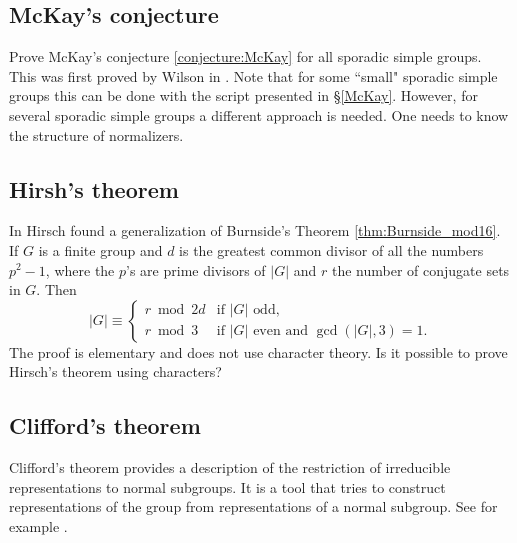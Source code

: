 \subsection*{McKay's conjecture}

Prove McKay's conjecture \ref{conjecture:McKay} for all sporadic simple groups. 
This was first proved by Wilson in \cite{MR1643110}. 
Note that
for some ``small" sporadic simple groups this can be done
with the script presented in \S\ref{McKay}. However, 
for several sporadic simple groups a different approach is needed. One needs
to know the structure of normalizers. 




\subsection*{Hirsh's theorem}

In \cite{MR36755} Hirsch found a generalization of Burnside's Theorem \ref{thm:Burnside_mod16}.  
If $G$ is a finite group and $d$ is the greatest common divisor of all 
the numbers $p^2-1$, where the $p$'s are prime divisors of $|G|$ and $r$ the number of conjugate sets in $G$. Then 
\[
|G|\equiv\begin{cases} 
    r\bmod 2d &\text{if $|G|$ odd,}\\
    r\bmod 3 & \text{if $|G|$ even and $\gcd(|G|,3)=1$.}
    \end{cases}
\]
The proof is elementary and does not use character theory. Is it possible
to prove Hirsch's theorem using characters?

\subsection*{Clifford's theorem}

Clifford’s theorem provides a description of the restriction of  irreducible representations to normal subgroups. It is a tool
that tries to construct representations of the group
from representations of a normal subgroup. See for example
\cite[Chapter~7]{MR3970262}. 

